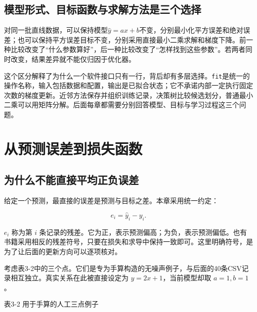 \subsection{模型形式、目标函数与求解方法是三个选择}
对同一批直线数据，可以保持模型$\hat y=ax+b$不变，分别最小化平方误差和绝对误差；也可以保持平方误差目标不变，分别采用直接最小二乘求解和梯度下降。前一种比较改变了“什么参数算好”，后一种比较改变了“怎样找到这些参数”。若两者同时改变，结果差异就不能仅归因于优化器。

这个区分解释了为什么一个软件接口只有一行，背后却有多层选择。\texttt{fit}是统一的操作名称，输入包括数据和配置，输出是已拟合状态；它不承诺内部一定执行固定次数的梯度更新。近邻方法保存并组织训练记录，决策树比较候选划分，普通最小二乘可以用矩阵分解。后面每章都需要分别回答模型、目标与学习过程这三个问题。

\section{从预测误差到损失函数}

\subsection{为什么不能直接平均正负误差}

给定一个预测，最直接的误差是预测与目标之差。本章采用统一约定：

\[e_{i} = {\widehat{y}}_{i} - y_{i}.\]

\(e_{i}\) 称为第 \(i\) 条记录的残差。它为正，表示预测偏高；为负，表示预测偏低。也有书籍采用相反的残差符号，只要在损失和求导中保持一致即可。这里明确符号，是为了让后面的更新方向可以逐项核对。

考虑表3-2中的三个点。它们是专为手算构造的无噪声例子，与后面的40条CSV记录相互独立。真实关系在此被直接设定为 \(y = 2x + 1\)，当前模型却取 \(a = 1,b = 1\)。

表3-2 用于手算的人工三点例子


